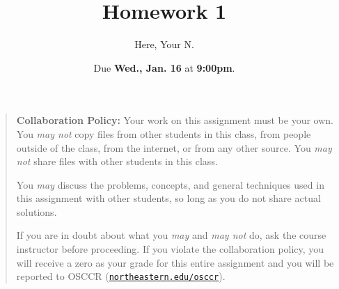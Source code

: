 \documentclass{article}
\title{Homework 1}
\author{Here, Your N.}
\date{Due \textbf{Wed., Jan. 16} at \textbf{9:00pm}.}
\begin{document}
\maketitle

\newcommand\link[2][http://]{\href{#1#2}{\nolinkurl{#2}}}
\newcommand\http[1]{\link[http://]{#1}}
\newcommand\https[1]{\link[https://]{#1}}
\newcommand\email[1]{\link[mailto:]{#1}}

\begin{quotation}

  \noindent \textbf{Collaboration Policy:} Your work on this assignment must be
  your own.  You \emph{may not} copy files from other students in this class,
  from people outside of the class, from the internet, or from any other source.
  You \emph{may not} share files with other students in this class.

  \medskip

  \noindent You \emph{may} discuss the problems, concepts, and general
  techniques used in this assignment with other students, so long as you do not
  share actual solutions.

  \medskip

  \noindent If you are in doubt about what you \emph{may} and \emph{may not} do,
  ask the course instructor before proceeding.  If you violate the collaboration
  policy, you will receive a zero as your grade for this entire assignment and
  you will be reported to OSCCR (\link{northeastern.edu/osccr}).

\end{quotation}
\end{document}
